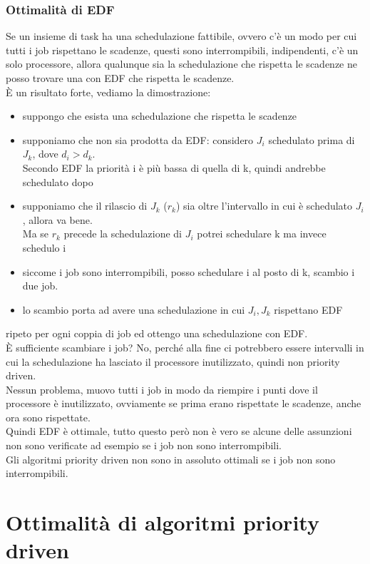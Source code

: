 \documentclass[12pt, oneside]{extbook}
\begin{document}
\subsection{Ottimalità di EDF}
Se un insieme di task ha una schedulazione fattibile, ovvero c'è un modo per cui tutti i job rispettano le scadenze, questi sono interrompibili, indipendenti, c'è un solo processore, allora qualunque sia la schedulazione che rispetta le scadenze ne posso trovare una con EDF che rispetta le scadenze.\\
È un risultato forte, vediamo la dimostrazione:
\begin{itemize}
	\item suppongo che esista una schedulazione che rispetta le scadenze
	\item supponiamo che non sia prodotta da EDF: considero $J_i$ schedulato prima di $J_k$, dove $d_i > d_k$.\\
	Secondo EDF la priorità i è più bassa di quella di k, quindi andrebbe schedulato dopo
	\item supponiamo che il rilascio di $J_k$ ($r_k$) sia oltre l'intervallo in cui è schedulato $J_i$, allora va bene.\\
	Ma se $r_k$ precede la schedulazione di $J_i$ potrei schedulare k ma invece schedulo i
	\item siccome i job sono interrompibili, posso schedulare i al posto di k, scambio i due job.
	\item lo scambio porta ad avere una schedulazione in cui $J_i, J_k$ rispettano EDF
\end{itemize}
ripeto per ogni coppia di job ed ottengo una schedulazione con EDF.\\
È sufficiente scambiare i job? No, perché alla fine ci potrebbero essere intervalli in cui la schedulazione ha lasciato il processore inutilizzato, quindi non priority driven.\\
Nessun problema, muovo tutti i job in modo da riempire i punti dove il processore è inutilizzato, ovviamente se prima erano rispettate le scadenze, anche ora sono rispettate.\\
Quindi EDF è ottimale, tutto questo però non è vero se alcune delle assunzioni non sono verificate ad esempio se i job non sono interrompibili.\\
Gli algoritmi priority driven non sono in assoluto ottimali se i job non sono interrompibili.

\chapter{Ottimalità di algoritmi priority driven}
\end{document}
